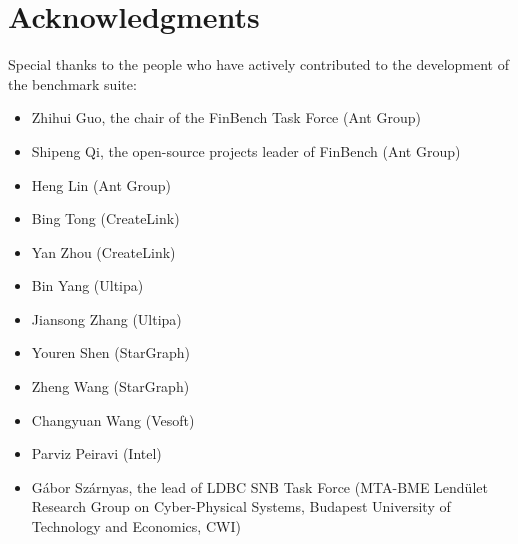 \chapter*{Acknowledgments}
\label{sec:acknowledgments}

\renewcommand{\labelitemii}{\textbullet}

Special thanks to the people who have actively contributed to the development of the benchmark suite:

\begin{itemize}
  \item Zhihui Guo, the chair of the FinBench Task Force (Ant Group)
  \item Shipeng Qi, the open-source projects leader of FinBench (Ant Group)
  \item Heng Lin (Ant Group)
  \item Bing Tong (CreateLink)
  \item Yan Zhou (CreateLink)
  \item Bin Yang (Ultipa)
  \item Jiansong Zhang (Ultipa)
  \item Youren Shen (StarGraph)
  \item Zheng Wang (StarGraph)
  \item Changyuan Wang (Vesoft)
  \item Parviz Peiravi (Intel)
  \item Gábor Szárnyas, the lead of LDBC SNB Task Force (MTA-BME Lendület Research Group on Cyber-Physical Systems, Budapest University
  of Technology and Economics, CWI)
\end{itemize}